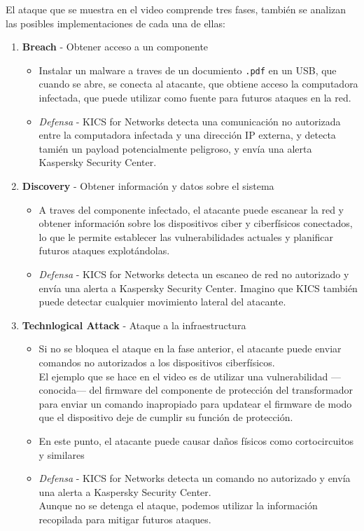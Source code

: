 El ataque que se muestra en el video comprende tres fases, también se analizan las posibles implementaciones de cada una de ellas:
\begin{enumerate}
   \item \textbf{Breach} - Obtener acceso a un componente
   \begin{itemize}
      \item Instalar un malware a traves de un documiento \texttt{.pdf} en un USB, que cuando se abre, se conecta al atacante, que obtiene acceso la computadora infectada, que puede utilizar como fuente para futuros ataques en la red.
      \item \textit{Defensa} - KICS for Networks detecta una comunicación no autorizada entre la computadora infectada y una dirección IP externa, y detecta tamién un payload potencialmente peligroso, y envía una alerta Kaspersky Security Center.
   \end{itemize}
   \item \textbf{Discovery} - Obtener información y datos sobre el sistema
   \begin{itemize}
      \item A traves del componente infectado, el atacante puede escanear la red y obtener información sobre los dispositivos ciber y ciberfísicos conectados, lo que le permite establecer las vulnerabilidades actuales y planificar futuros ataques explotándolas.
      \item \textit{Defensa} - KICS for Networks detecta un escaneo de red no autorizado y envía una alerta a Kaspersky Security Center. Imagino que KICS también puede detectar cualquier movimiento lateral del atacante.
   \end{itemize}
   \item \textbf{Technlogical Attack} - Ataque a la infraestructura
   \begin{itemize}
      \item Si no se bloquea el ataque en la fase anterior, el atacante puede enviar comandos no autorizados a los dispositivos ciberfísicos.\\
      El ejemplo que se hace en el video es de utilizar una vulnerabilidad ---conocida--- del firmware del componente de protección del transformador para enviar un comando inapropiado para updatear el firmware de modo que el dispositivo deje de cumplir su función de protección.
      \item En este punto, el atacante puede causar daños físicos como cortocircuitos y similares
      \item \textit{Defensa} - KICS for Networks detecta un comando no autorizado y envía una alerta a Kaspersky Security Center.\\
      Aunque no se detenga el ataque, podemos utilizar la información recopilada para mitigar futuros ataques.
   \end{itemize}
\end{enumerate}

